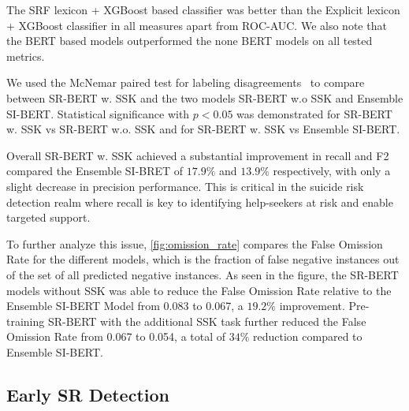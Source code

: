\documentclass[letterpaper]{article} %
\begin{document}
The SRF lexicon + XGBoost based classifier was better than the Explicit lexicon + XGBoost classifier in all measures apart from ROC-AUC.
We also note that the BERT based models outperformed the none BERT models on all tested metrics.

We used the  McNemar paired test for labeling disagreements~\cite{gllick} to compare between SR-BERT w. SSK and the two models SR-BERT w.o SSK and Ensemble SI-BERT. Statistical significance with $p < 0.05$ was demonstrated for SR-BERT w. SSK vs SR-BERT w.o. SSK and for SR-BERT w. SSK vs Ensemble SI-BERT.


Overall SR-BERT w. SSK achieved a substantial improvement in recall and F2 compared the Ensemble SI-BRET of $17.9\%$ and $13.9\%$  respectively, with only a slight decrease in precision performance. This is critical in the suicide risk detection realm where recall is key to identifying help-seekers at risk and enable targeted support.

To further analyze this issue,  \autoref{fig:omission_rate} compares the False Omission Rate for the different models, which is the fraction of false negative instances out of the set of all predicted negative instances.
%
As seen in the figure, the SR-BERT models without SSK was able to reduce the False Omission Rate relative to the Ensemble SI-BERT Model from 0.083 to 0.067, a $19.2\%$ improvement. Pre-training SR-BERT with the additional SSK task further reduced the False Omission Rate from  0.067 to 0.054, a total of $34\%$ reduction compared to Ensemble SI-BERT.

\subsection{Early SR Detection}
\end{document}
